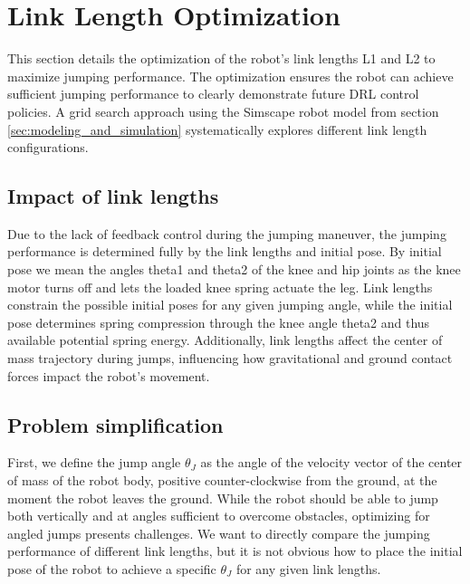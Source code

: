 \section{Link Length Optimization}
\label{sec:link_length_optimization}
This section details the optimization of the robot's link lengths L1 and L2 to maximize jumping performance. The optimization ensures the robot can achieve sufficient jumping performance to clearly demonstrate future DRL control policies. A grid search approach using the Simscape robot model from section \ref{sec:modeling_and_simulation} systematically explores different link length configurations.



\subsection{Impact of link lengths}
Due to the lack of feedback control during the jumping maneuver, the jumping performance is determined fully by the link lengths and initial pose. By initial pose we mean the angles theta1 and theta2 of the knee and hip joints as the knee motor turns off and lets the loaded knee spring actuate the leg. Link lengths constrain the possible initial poses for any given jumping angle, while the initial pose determines spring compression through the knee angle theta2 and thus available potential spring energy. Additionally, link lengths affect the center of mass trajectory during jumps, influencing how gravitational and ground contact forces impact the robot's movement.

\subsection{Problem simplification}
\label{problem_simplifications}
 First, we define the jump angle \(\theta_J\) as the angle of the velocity vector of the center of mass of the robot body, positive counter-clockwise from the ground, at the moment the robot leaves the ground. While the robot should be able to jump both vertically and at angles sufficient to overcome obstacles, optimizing for angled jumps presents challenges. We want to directly compare the jumping performance of different link lengths, but it is not obvious how to place the initial pose of the robot to achieve a specific \(\theta_J\) for any given link lengths.

